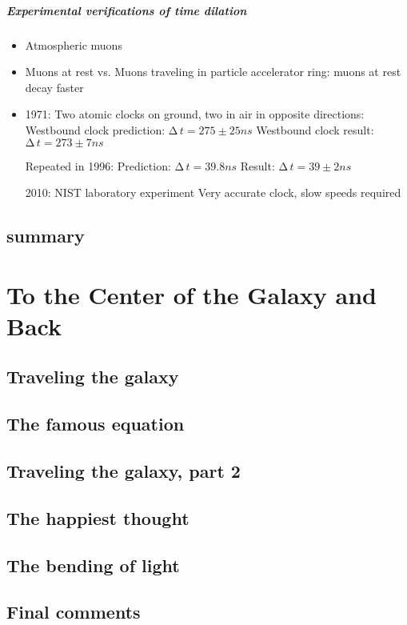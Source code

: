 \documentclass[pagesize,headsepline,10pt,parskip=half]{scrreprt}
\newcommand*\mdelta[1]{\ensuremath{\mathrm{\Delta\,}#1}}
\begin{document}
        \paragraph{Experimental verifications of time dilation}
          \begin{itemize}
            \item Atmospheric muons
            \item Muons at rest vs. Muons traveling in particle accelerator ring:
              muons at rest decay faster
            \item 1971: Two atomic clocks on ground, two in air in opposite directions:
              Westbound clock prediction: $\mdelta{t} = 275 \pm 25 ns$
              Westbound clock result: $\mdelta{t} = 273 \pm 7 ns$

              Repeated in 1996:
              Prediction: $\mdelta{t} = 39.8 ns$
              Result: $\mdelta{t} = 39 \pm 2 ns$

              2010: NIST laboratory experiment
              Very accurate clock, slow speeds required
          \end{itemize}

    \section{summary}

  \chapter{To the Center of the Galaxy and Back}
    \section{Traveling the galaxy}
    \section{The famous equation}
    \section{Traveling the galaxy, part 2}
    \section{The happiest thought}
    \section{The bending of light}
    \section{Final comments}

  \begingroup
    \printbibliography[heading=lit]
  \endgroup
\end{document}
